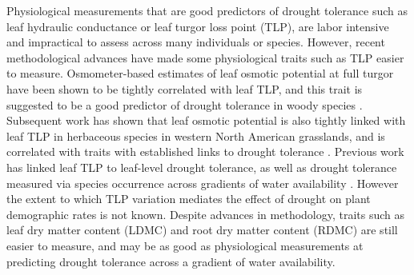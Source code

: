 \documentclass[12pt, letterpaper]{article}
\begin{document}
Physiological measurements that are good predictors of drought tolerance such as leaf hydraulic conductance or leaf turgor loss point (TLP), are labor intensive and impractical to assess across many individuals or species. However, recent methodological advances have made some physiological traits such as TLP easier to measure. Osmometer-based estimates of leaf osmotic potential at full turgor have been shown to be tightly correlated with leaf TLP, and this trait is suggested to be a good predictor of drought tolerance in woody species \citep{Bartlett2012}. Subsequent work has shown that leaf osmotic potential is also tightly linked with leaf TLP in herbaceous species in western North American grasslands, and is correlated with traits with established links to drought tolerance \citep{Griffin-Nolan2019}. Previous work has linked leaf TLP to leaf-level drought tolerance, as well as drought tolerance measured via species occurrence across gradients of water availability \citep{Bartlett2012a,Blumenthal2020,Wilcox2020PlantPrairie}.
However the extent to which TLP variation mediates the effect of drought on plant demographic rates is not known. Despite advances in methodology, traits such as leaf dry matter content (LDMC) and root dry matter content (RDMC) are still easier to measure, and may be as good as physiological measurements at predicting drought tolerance across a gradient of water availability\citep{Bartlett2012,Griffin-Nolan2019,Blumenthal2020}.
\end{document}
